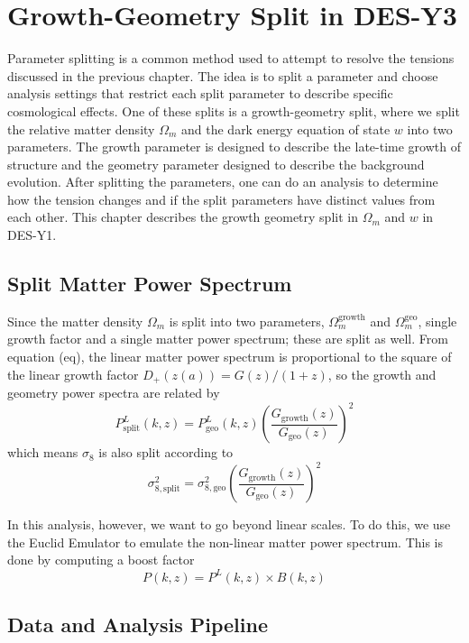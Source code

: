 \chapter{Growth-Geometry Split in DES-Y3}
Parameter splitting is a common method used to attempt to resolve the tensions discussed in the previous chapter. The idea is to split a parameter and choose analysis settings that restrict each split parameter to describe specific cosmological effects. One of these splits is a growth-geometry split, where we split the relative matter density $\Omega_m$ and the dark energy equation of state $w$ into two parameters. The growth parameter is designed to describe the late-time growth of structure and the geometry parameter designed to describe the background evolution. After splitting the parameters, one can do an analysis to determine how the tension changes and if the split parameters have distinct values from each other. This chapter describes the growth geometry split in $\Omega_m$ and $w$ in DES-Y1.
\section{Split Matter Power Spectrum}
Since the matter density $\Omega_m$ is split into two parameters, $\Omega_m^{\text{growth}}$ and $\Omega_m^{\text{geo}}$, single growth factor and a single matter power spectrum; these are split as well. From equation (eq), the linear matter power spectrum is proportional to the square of the linear growth factor $D_+(z(a)) = G(z)/(1+z)$, so the growth and geometry power spectra are related by
\begin{equation}
	P^L_{\text{split}}(k,z) = P^L_{\text{geo}}(k,z) \left(\frac{G_{\text{growth}}(z)}{G_{\text{geo}}(z)}\right)^2
\end{equation}
which means $\sigma_8$ is also split according to
\begin{equation}
	\sigma_{8,\text{split}}^2 = \sigma_{8,\text{geo}}^2 \left(\frac{G_{\text{growth}}(z)}{G_{\text{geo}}(z)}\right)^2
\end{equation}

In this analysis, however, we want to go beyond linear scales. To do this, we use the Euclid Emulator to emulate the non-linear matter power spectrum. This is done by computing a boost factor
\begin{equation}
	P(k,z) = P^L(k,z) \times B(k,z)
\end{equation}
\section{Data and Analysis Pipeline}
